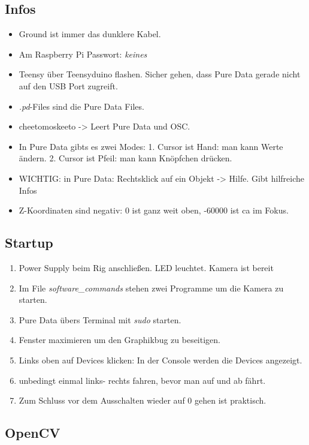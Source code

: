 \documentclass[11pt,a4paper]{article}
\begin{document}
\subsection*{Infos}
\begin{itemize}
	\item Ground ist immer das dunklere Kabel.
	\item Am Raspberry Pi Passwort: \emph{keines}
	\item Teensy über Teensyduino flashen. Sicher gehen, dass Pure Data gerade nicht auf den USB Port zugreift.
	\item \emph{.pd}-Files sind die Pure Data Files.
	\item cheetomoskeeto -> Leert Pure Data und OSC.
	\item In Pure Data gibts es zwei Modes: 1. Cursor ist Hand: man kann Werte ändern. 2. Cursor ist Pfeil: man kann Knöpfchen drücken.
	\item WICHTIG: in Pure Data: Rechtsklick auf ein Objekt -> Hilfe. Gibt hilfreiche Infos
	\item Z-Koordinaten sind negativ: 0 ist ganz weit oben, -60000 ist ca im Fokus.
\end{itemize}

\subsection*{Startup}
\begin{enumerate}
	\item Power Supply beim Rig anschließen. LED leuchtet. Kamera ist bereit
	\item Im File \emph{software\_commands} stehen zwei Programme um die Kamera zu starten.
	\item Pure Data übers Terminal mit \emph{sudo} starten.
	\item Fenster maximieren um den Graphikbug zu beseitigen.
	\item Links oben auf Devices klicken: In der Console werden die Devices angezeigt. 
	\item unbedingt einmal links- rechts fahren, bevor man auf und ab fährt.
	\item Zum Schluss vor dem Ausschalten wieder auf 0 gehen ist praktisch.
\end{enumerate}
\subsection*{OpenCV}
\end{document}
